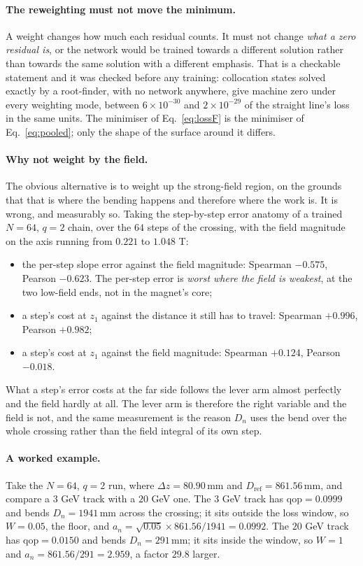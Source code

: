 \documentclass[11pt,a4paper]{article}
\newcommand{\mm}{\ensuremath{\,\mathrm{mm}}}
\newcommand{\qop}{\ensuremath{\mathrm{qop}}}
\begin{document}
\paragraph{The reweighting must not move the minimum.} A weight changes how
much each residual counts. It must not change \emph{what a zero residual is},
or the network would be trained towards a different solution rather than
towards the same solution with a different emphasis. That is a checkable
statement and it was checked before any training: collocation states solved
exactly by a root-finder, with no network anywhere, give machine zero under
every weighting mode, between $6\times10^{-30}$ and $2\times10^{-29}$ of the
straight line's loss in the same units. The minimiser of
Eq.~\eqref{eq:lossF} is the minimiser of Eq.~\eqref{eq:pooled}; only the shape
of the surface around it differs.

\paragraph{Why not weight by the field.} The obvious alternative is to weight
up the strong-field region, on the grounds that that is where the bending
happens and therefore where the work is. It is wrong, and measurably so. Taking
the step-by-step error anatomy of a trained $N = 64$, $q = 2$ chain, over the
$64$ steps of the crossing, with the field magnitude on the axis running from
$0.221$ to $1.048$ T:

\begin{itemize}
  \item the per-step slope error against the field magnitude: Spearman $-0.575$,
  Pearson $-0.623$. The per-step error is \emph{worst where the field is
  weakest}, at the two low-field ends, not in the magnet's core;
  \item a step's cost at $z_1$ against the distance it still has to travel:
  Spearman $+0.996$, Pearson $+0.982$;
  \item a step's cost at $z_1$ against the field magnitude: Spearman $+0.124$,
  Pearson $-0.018$.
\end{itemize}

What a step's error costs at the far side follows the lever arm almost
perfectly and the field hardly at all. The lever arm is therefore the right
variable and the field is not, and the same measurement is the reason $D_n$
uses the bend over the whole crossing rather than the field integral of its own
step.

\paragraph{A worked example.} Take the $N = 64$, $q = 2$ run, where
$\Delta z = 80.90\mm$ and $D_{\mathrm{ref}} = 861.56\mm$, and compare a
$3$ GeV track with a $20$ GeV one. The $3$ GeV track has
$\qop = 0.0999$ and bends $D_n = 1941\mm$ across the crossing; it sits outside
the loss window, so $W = 0.05$, the floor, and
$a_n = \sqrt{0.05}\times 861.56/1941 = 0.0992$. The $20$ GeV track has
$\qop = 0.0150$ and bends $D_n = 291\mm$; it sits inside the window, so $W = 1$
and $a_n = 861.56/291 = 2.959$, a factor $29.8$ larger.
\end{document}
